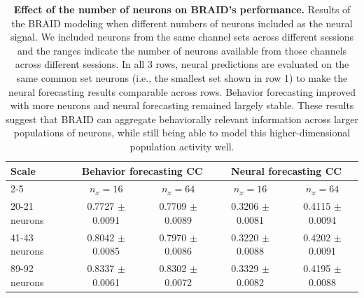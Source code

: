 \documentclass{article} %
\newcommand{\ourmethod}{BRAID}
\begin{document}
\begin{table}[t]
\caption{\textbf{Effect of the number of neurons on \ourmethod{}'s performance.} Results of the \ourmethod{} modeling when different numbers of neurons included as the neural signal. We included neurons from the same channel sets across different sessions and the ranges indicate the number of neurons available from those channels across different sessions. In all 3 rows, neural predictions are evaluated on the same common set neurons (i.e., the smallest set shown in row 1) to make the neural forecasting results comparable across rows. Behavior forecasting improved with more neurons and neural forecasting remained largely stable. These results suggest that \ourmethod{} can aggregate behaviorally relevant information across larger populations of neurons, while still being able to model this higher-dimensional population activity well. }
\label{tab: neuron_scale}
\begin{center}
\begin{tabular}{l|c|c|c|c}
\multirow{2}{*}{\textbf{Scale}} & \multicolumn{2}{c|}{\textbf{Behavior forecasting CC}} & \multicolumn{2}{c}{\textbf{Neural forecasting CC}} \\ \cline{2-5} & $n_x=16$ & $n_x=64$ & $n_x=16$ & $n_x=64$ \\
\midrule
20-21 neurons & 0.7727 \(\pm\) 0.0091 & 0.7709 \(\pm\) 0.0089 & 0.3206 \(\pm\) 0.0081 & 0.4115 \(\pm\) 0.0094 \\
41-43 neurons & 0.8042 \(\pm\) 0.0085 & 0.7970 \(\pm\) 0.0086 &  0.3220 \(\pm\) 0.0088 & 0.4202 \(\pm\) 0.0091 \\
89-92 neurons & 0.8337 \(\pm\) 0.0061 & 0.8302 \(\pm\) 0.0072 & 0.3329 \(\pm\) 0.0082 & 0.4195 \(\pm\) 0.0088 \\
\end{tabular}
\end{center}
\end{table}


\end{document}
